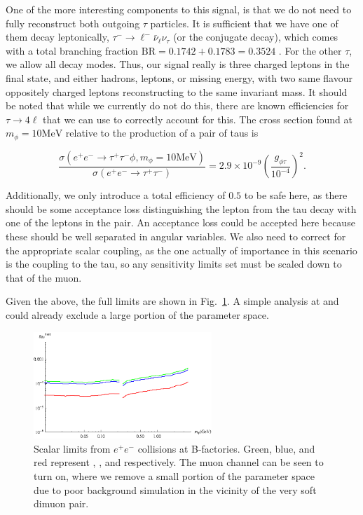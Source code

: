 One of the more interesting components to this signal, is that we do not need to fully reconstruct both outgoing $\tau$ particles.
It is sufficient that we have one of them decay leptonically, $\tau^- \rightarrow \ell^- \bar{\nu}_\ell \nu_\tau$ (or the conjugate decay), which comes with a total branching fraction $\textrm{BR} = 0.1742 + 0.1783 = 0.3524$ \cite{Agashe:2014kda}.
For the other $\tau$, we allow all decay modes.
Thus, our signal really is three charged leptons in the final state, and either hadrons, leptons, or missing energy, with two same flavour oppositely charged leptons reconstructing to the same invariant mass.
It should be noted that while we currently do not do this, there are known efficiencies for $\tau \rightarrow 4\ell$ that we can use to correctly account for this.
The cross section found at $m_\phi = 10\textrm{MeV}$ relative to the production of a pair of taus is

\begin{equation}
    \frac{\sigma\left(e^+ e^- \rightarrow \tau^+ \tau^- \phi, m_\phi = 10\textrm{MeV}\right)}{\sigma\left(e^+ e^- \rightarrow \tau^+ \tau^-\right)} = 2.9 \times 10^{-9} \left(\frac{g_{\phi\tau}}{10^{-4}}\right)^2\textrm{.}
\end{equation}

Additionally, we only introduce a total efficiency of $0.5$ to be safe here, as there should be some acceptance loss distinguishing the lepton from the tau decay with one of the leptons in the pair.
An acceptance loss could be accepted here because these should be well separated in angular variables.
We also need to correct for the appropriate scalar coupling, as the one actually of importance in this scenario is the coupling to the tau, so any sensitivity limits set must be scaled down to that of the muon.

Given the above, the full limits are shown in Fig.\ \ref{fig:ee_limits}.
A simple analysis at \babar and \belle could already exclude a large portion of the parameter space.

\begin{figure}[h]
    \centering
    \includegraphics[width=0.6\textwidth]{Figures/limits/ee_all}
    \caption{Scalar limits from $e^+ e^-$ collisions at B-factories. Green, blue, and red represent \babar, \belle, and \belletwo respectively. The muon channel can be seen to turn on, where we remove a small portion of the parameter space due to poor background simulation in the vicinity of the very soft dimuon pair.}
    \label{fig:ee_limits}
\end{figure}

